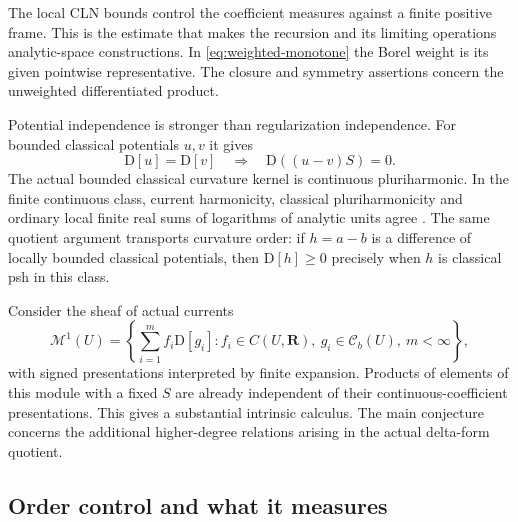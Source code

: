 \documentclass[11pt,a4paper]{article}
\newcommand{\MathEqref}[1]{{\hypersetup{linkcolor=EquationLink}\eqref{#1}}}
\theoremstyle{definition}
\theoremstyle{remark}
\numberwithin{equation}{section}
\newcommand{\R}{\mathbf R}
\newcommand{\D}{\mathrm D}
\newcommand{\Cb}{\mathcal C_b}
\begin{document}
The local CLN bounds control the coefficient measures against a finite
positive frame.  This is the estimate that makes the recursion and
its limiting operations analytic-space constructions.  In
\MathEqref{eq:weighted-monotone} the Borel weight is its given pointwise
representative.  The closure and symmetry assertions concern the
unweighted differentiated product.

Potential independence is stronger than regularization independence.
For bounded classical potentials $u,v$ it gives
\begin{equation}
                  \D[u]=\D[v]\quad\Longrightarrow\quad
                              \D((u-v)S)=0.
                              \label{eq:potential-independence}
\end{equation}
The actual bounded classical curvature kernel is continuous
pluriharmonic.  In the finite continuous class, current harmonicity,
classical pluriharmonicity and ordinary local finite real sums of
logarithms of analytic units agree \cite{R24}.  The same quotient
argument transports curvature order: if $h=a-b$ is a difference of
locally bounded classical potentials, then $\D[h]\ge0$ precisely when
$h$ is classical psh in this class.

Consider the sheaf of actual currents
\begin{equation}
 \mathcal M^1(U)=
   \left\{\sum_{i=1}^m f_i\D[g_i]:
        f_i\in C(U,\R),\ g_i\in\Cb(U),\ m<\infty\right\},
                         \label{eq:curvature-module}
\end{equation}
with signed presentations interpreted by finite expansion.  Products
of elements of this module with a fixed $S$ are already independent
of their continuous-coefficient presentations.  This gives a
substantial intrinsic calculus.  The main conjecture concerns the
additional higher-degree relations arising in the actual delta-form
quotient.

\subsection{Order control and what it measures}
\end{document}
